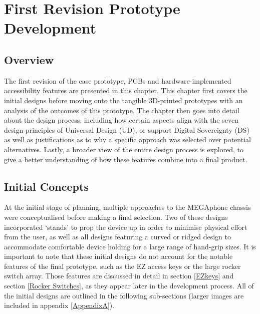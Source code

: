 
\chapter{First Revision Prototype Development} %

\label{Chapter4} %

\section{Overview} %

The first revision of the case prototype, PCBs and hardware-implemented accessibility features are presented in this chapter.
This chapter first covers the initial designs before moving onto the tangible 3D-printed prototypes with an analysis of the outcomes of this prototype.
The chapter then goes into detail about the design process, including how certain aspects align with the seven design principles of Universal Design (UD), or support Digital Sovereignty (DS) as well as justifications as to why a specific approach was selected over potential alternatives.
Lastly, a broader view of the entire design process is explored, to give a better understanding of how these features combine into a final product.

\section{Initial Concepts} \label{Initial}

At the initial stage of planning, multiple approaches to the MEGAphone chassis were conceptualised before making a final selection.
Two of these designs incorporated ‘stands’ to prop the device up in order to minimise physical effort from the user, as well as all designs featuring a curved or ridged design to accommodate comfortable device holding for a large range of hand-grip sizes. 
It is important to note that these initial designs do not account for the notable features of the final prototype, such as the EZ access keys or the large rocker switch array.
Those features are discussed in detail in section \ref{EZkeys} and section \ref{Rocker Switches}, as they appear later in the development process.
All of the initial designs are outlined in the following sub-sections (larger images are included in appendix \ref{AppendixA}).

